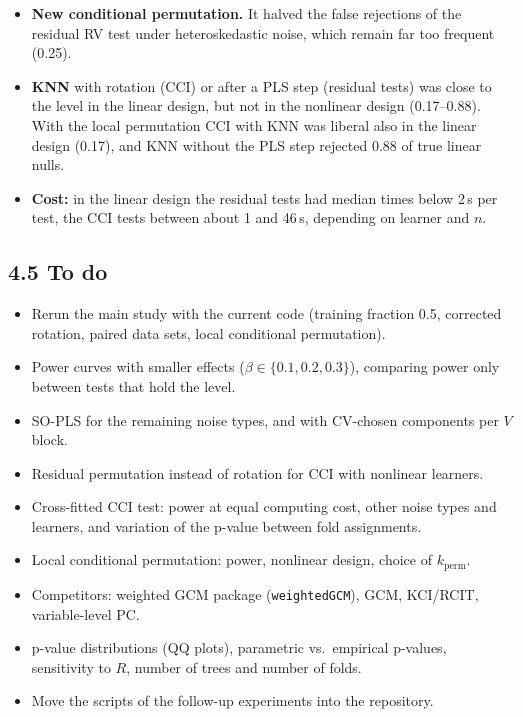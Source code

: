 \documentclass[10pt,leqno]{amsart}
\newcommand{\fn}[1]{\texttt{#1}}            %
\begin{document}
\begin{itemize}
  runs), but too liberal with RF. The default remains one observed split.
\item \textbf{New conditional permutation.} It halved the false rejections of the
  residual RV test under heteroskedastic noise, which remain far too frequent (0.25).
\item \textbf{KNN} with rotation (CCI) or after a PLS step (residual tests) was close to
  the level in the linear design, but not in the nonlinear design (0.17--0.88). With
  the local permutation CCI with KNN was liberal also in the linear design (0.17), and
  KNN without the PLS step rejected 0.88 of true linear nulls.
\item \textbf{Cost:} in the linear design the residual tests had median times below 2\,s
  per test, the CCI tests between about 1 and 46\,s, depending on learner and $n$.
\end{itemize}

\subsection*{4.5 To do}
\begin{itemize}
\item Rerun the main study with the current code (training fraction 0.5, corrected
  rotation, paired data sets, local conditional permutation).
\item Power curves with smaller effects ($\beta\in\{0.1,0.2,0.3\}$), comparing power
  only between tests that hold the level.
\item SO-PLS for the remaining noise types, and with CV-chosen components per $V$
  block.
\item Residual permutation instead of rotation for CCI with nonlinear learners.
\item Cross-fitted CCI test: power at equal computing cost, other noise types and
  learners, and variation of the p-value between fold assignments.
\item Local conditional permutation: power, nonlinear design, choice of
  $k_{\mathrm{perm}}$.
\item Competitors: weighted GCM package (\fn{weightedGCM}), GCM, KCI/RCIT,
  variable-level PC.
\item p-value distributions (QQ plots), parametric vs.\ empirical p-values,
  sensitivity to $R$, number of trees and number of folds.
\item Move the scripts of the follow-up experiments into the repository.
\end{itemize}
\end{document}

